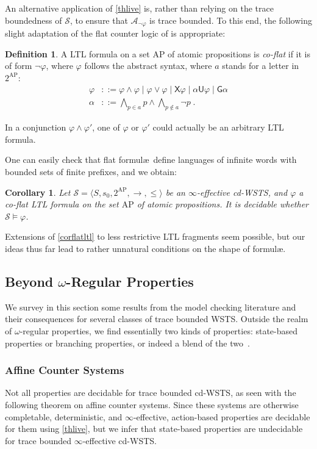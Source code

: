 \documentclass[11pt,reqno,a4paper]{amsart}
\newcommand{\tup}[1]{\langle #1\rangle}
\theoremstyle{plain}
\newtheorem{corollary}[theorem]{Corollary}
\theoremstyle{definition}
\newtheorem{definition}[theorem]{Definition}
\theoremstyle{remark}
\renewcommand{\paragraph}{\subsubsection*}
\begin{document}
An alternative application of \autoref{thlive} is, rather than
relying on the trace boundedness of $\mathcal{S}$, to ensure that
$\mathcal{A}_{\neg\varphi}$ is trace bounded.  To this end, the following
slight adaptation of the flat counter logic of \citet{flatltl} is
appropriate:\begin{definition}
  A LTL formula on a set $\mathrm{AP}$ of atomic propositions is
  \emph{co-flat} if it is of form $\neg\varphi$, where $\varphi$
  follows the abstract syntax, where $a$ stands for a letter
  in~$2^\mathrm{AP}$:
  \begin{align}
    \varphi &::=
    \varphi\wedge\varphi\mid\varphi\vee\varphi\mid\mathsf{X}\varphi\mid\alpha\mathsf{U}\varphi\mid\mathsf{G}\alpha\tag{flat
    formul\ae}\\
    \alpha&::= \bigwedge_{p\in a}p\wedge\bigwedge_{p\not\in a}\neg
    p\;.\tag{alphabetic formul\ae}
  \end{align}
\end{definition}
\noindent In a conjunction $\varphi\wedge\varphi'$, one of $\varphi$ or
$\varphi'$ could actually be an arbitrary LTL formula.

One can easily check that flat formul\ae\ define languages of infinite
words with bounded sets of finite prefixes, and we obtain:
\begin{corollary}\label{corflatltl}Let $\mathcal{S}=\tup{S,s_0,2^{\mathrm{AP}},\rightarrow,\leq}$ be an
  $\infty$-effective cd-WSTS, and $\varphi$ a
  co-flat LTL formula on the set $\mathrm{AP}$ of atomic propositions.
  It is decidable whether $\mathcal{S}\models\varphi$.
\end{corollary}
Extensions of \autoref{corflatltl} to less restrictive LTL fragments
seem possible, but our ideas thus far lead to rather unnatural
conditions on the shape of
formul\ae.

\subsection{Beyond $\omega$-Regular Properties}\label{sub:beyltl}
We survey in this section some results from the model checking
literature and their consequences for several classes of trace bounded
WSTS.  Outside the realm of $\omega$-regular properties, we find
essentially two kinds of properties: state-based
properties or branching properties, or indeed a blend of the
two~\citep{foctlpr,lpar06,cwsts0}.

\paragraph{Affine Counter Systems}
Not all properties are decidable for trace bounded cd-WSTS, as seen with
the following theorem on affine counter systems.  Since these systems
are otherwise completable, deterministic, and $\infty$-effective,
action-based properties are decidable for them using
\autoref{thlive}, but we infer that state-based properties are
undecidable for trace bounded $\infty$-effective cd-WSTS.
\end{document}
